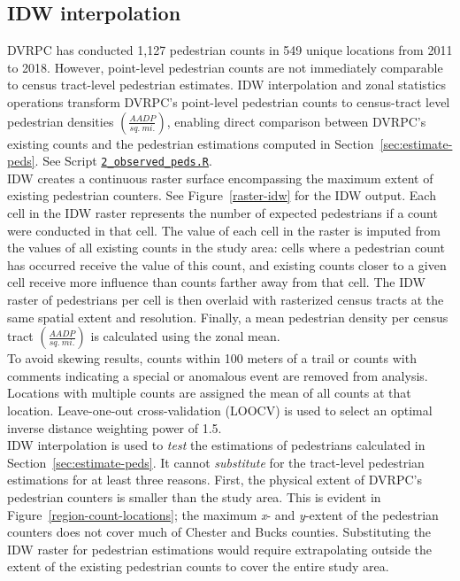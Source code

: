 \documentclass[paper=letterpaper, fontsize=11pt]{scrartcl}
\begin{document}
\subsection{IDW interpolation}
DVRPC has conducted 1,127 pedestrian counts in 549 unique locations from 2011 to 2018. However, point-level pedestrian counts are not immediately comparable to census tract-level pedestrian estimates. IDW interpolation and zonal statistics operations transform DVRPC's point-level pedestrian counts to census-tract level pedestrian densities $\left(\frac{AADP}{sq.\:mi.}\right)$, enabling direct comparison between DVRPC's existing counts and the pedestrian estimations computed in Section~\ref{sec:estimate-peds}. See Script \href{https://github.com/addisonlarson/ped_counts/blob/master/2_observed_peds.R}{\texttt{2\_observed\_peds.R}}. \\

IDW creates a continuous raster surface encompassing the maximum extent of existing pedestrian counters. See Figure~\ref{raster-idw} for the IDW output. Each cell in the IDW raster represents the number of expected pedestrians if a count were conducted in that cell. The value of each cell in the raster is imputed from the values of all existing counts in the study area: cells where a pedestrian count has occurred receive the value of this count, and existing counts closer to a given cell receive more influence than counts farther away from that cell. The IDW raster of pedestrians per cell is then overlaid with rasterized census tracts at the same spatial extent and resolution. Finally, a mean pedestrian density per census tract $\left(\frac{AADP}{sq.\:mi.}\right)$ is calculated using the zonal mean. \\

To avoid skewing results, counts within 100 meters of a trail or counts with comments indicating a special or anomalous event are removed from analysis. Locations with multiple counts are assigned the mean of all counts at that location. Leave-one-out cross-validation (LOOCV) is used to select an optimal inverse distance weighting power of 1.5. \\

IDW interpolation is used to \textit{test} the estimations of pedestrians calculated in Section~\ref{sec:estimate-peds}. It cannot \textit{substitute} for the tract-level pedestrian estimations for at least three reasons. First, the physical extent of DVRPC's pedestrian counters is smaller than the study area. This is evident in Figure~\ref{region-count-locations}; the maximum \textit{x}- and \textit{y}-extent of the pedestrian counters does not cover much of Chester and Bucks counties. Substituting the IDW raster for pedestrian estimations would require extrapolating outside the extent of the existing pedestrian counts to cover the entire study area. \\
\end{document}
